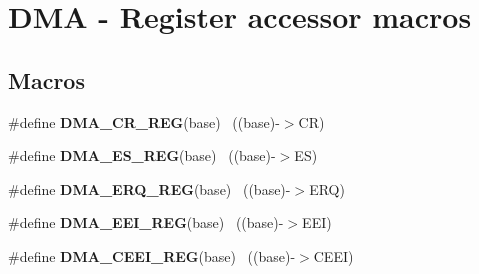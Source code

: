 \hypertarget{group___d_m_a___register___accessor___macros}{}\section{D\+M\+A -\/ Register accessor macros}
\label{group___d_m_a___register___accessor___macros}
\subsection*{Macros}
\begin{DoxyCompactItemize}
\item 
\hypertarget{group___d_m_a___register___accessor___macros_ga8264e02e6760922ef72bfa25a96a6cdc}{}\#define {\bfseries D\+M\+A\+\_\+\+C\+R\+\_\+\+R\+E\+G}(base)                                              ~((base)-\/$>$C\+R)\label{group___d_m_a___register___accessor___macros_ga8264e02e6760922ef72bfa25a96a6cdc}

\item 
\hypertarget{group___d_m_a___register___accessor___macros_ga2ee1967a3159d44a94704b4defad6834}{}\#define {\bfseries D\+M\+A\+\_\+\+E\+S\+\_\+\+R\+E\+G}(base)                                              ~((base)-\/$>$E\+S)\label{group___d_m_a___register___accessor___macros_ga2ee1967a3159d44a94704b4defad6834}

\item 
\hypertarget{group___d_m_a___register___accessor___macros_ga63136a5e3f8332d0ae96071c9e86d021}{}\#define {\bfseries D\+M\+A\+\_\+\+E\+R\+Q\+\_\+\+R\+E\+G}(base)                                            ~((base)-\/$>$E\+R\+Q)\label{group___d_m_a___register___accessor___macros_ga63136a5e3f8332d0ae96071c9e86d021}

\item 
\hypertarget{group___d_m_a___register___accessor___macros_ga5ac25f84896ff11bf829d1480229a8b8}{}\#define {\bfseries D\+M\+A\+\_\+\+E\+E\+I\+\_\+\+R\+E\+G}(base)                                            ~((base)-\/$>$E\+E\+I)\label{group___d_m_a___register___accessor___macros_ga5ac25f84896ff11bf829d1480229a8b8}

\item 
\hypertarget{group___d_m_a___register___accessor___macros_ga8a7c2447c69530cb585544dc5bc70b76}{}\#define {\bfseries D\+M\+A\+\_\+\+C\+E\+E\+I\+\_\+\+R\+E\+G}(base)                                          ~((base)-\/$>$C\+E\+E\+I)\label{group___d_m_a___register___accessor___macros_ga8a7c2447c69530cb585544dc5bc70b76}


\end{DoxyCompactItemize}
